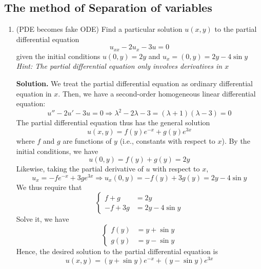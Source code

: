 \documentclass[a4paper]{article}
\begin{document}
\subsection{The method of Separation of variables}
\begin{enumerate}
    \item (PDE becomes fake ODE) Find a particular solution $u(x,y)$ to the partial differential equation
    \begin{equation*}
        u_{xx}-2u_x-3u=0
    \end{equation*}
    given the initial conditions $u(0,y)=2y$ and $u_x=(0,y)=2y-4\sin y$ \textit{Hint: The partial differential equation only involves derivatives in $x$}
    
    \textbf{Solution.}  We treat the partial differential equation as ordinary differential equation in $x$. Then, we have a second-order homogeneous linear differential equation:
    \begin{equation*}
        u''-2u'-3u=0\Rightarrow \lambda^2-2\lambda-3=(\lambda+1)(\lambda-3)=0
    \end{equation*}
    The partial differential equation thus has the general solution
    \begin{equation*}
        u(x,y)=f(y)e^{-x}+g(y)e^{3x}
    \end{equation*}
    where $f$ and $g$ are functions of $y$ (i.e., constants with respect to $x$). By the initial conditions, we have
    \begin{equation*}
        u(0,y)=f(y)+g(y)=2y
    \end{equation*}
    Likewise, taking the partial derivative of $u$ with respect to $x$,
    \begin{equation*}
        u_x=-fe^{-x}+3ge^{3x}\Rightarrow u_x(0,y)=-f(y)+3g(y)=2y-4\sin y
    \end{equation*}
    We thus require that
    \begin{equation*}
        \begin{cases}
            f+g&=2y\\
            -f+3g&=2y-4\sin y
        \end{cases}
    \end{equation*}
    Solve it, we have
    \begin{equation*}
        \begin{cases}
            f(y)&=y+\sin y \\
            g(y)&=y-\sin y
        \end{cases}
    \end{equation*}
    Hence, the desired solution to the partial differential equation is
    \begin{equation*}
        u(x,y)=(y+\sin y)e^{-x}+(y-\sin y)e^{3x}
    \end{equation*}
\end{enumerate}
\end{document}
